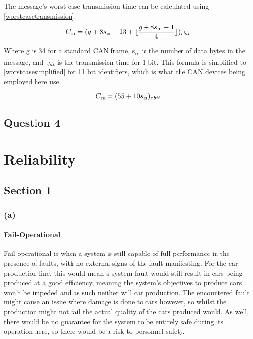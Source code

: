 \documentclass[]{report}
\begin{document}
		The message's worst-case transmission time can be calculated using \ref{worstcasetransmission}.
		\begin{equation}
		\label{worstcasetransmission}
		C\textsubscript{m} = (g + 8s\textsubscript{m} + 13 + \lfloor \frac{g + 8s\textsubscript{m} - 1}{4} \rfloor ) \textsubscript{$\tau bit$}
		\end{equation}
		
		Where g is 34 for a standard CAN frame, s\textsubscript{m} is the number of data bytes in the message, and \textsubscript{$\tau bit$} is the transmission time for 1 bit. This formula is simplified to \ref{worstcasesimplified} for 11 bit identifiers, which is what the CAN devices being employed here use.
		
		\begin{equation}
		\label{worstcasesimplified}
		C\textsubscript{m} = (55 + 10s\textsubscript{m})\textsubscript{$\tau bit$}
		\end{equation}
		
		\section{Question 4}
		
	
	
	\chapter{Reliability}
		\section{Section 1}
			\subsection{(a)}
				\subsubsection{Fail-Operational}
				Fail-operational is when a system is still capable of full performance in the presence of faults, with no external signs of the fault manifesting. For the car production line, this would mean a system fault would still result in cars being produced at a good efficiency, meaning the system's objectives to produce cars won't be impeded and as such neither will car production. The encountered fault might cause an issue where damage is done to cars however, so whilst the production might not fail the actual quality of the cars produced would. As well, there would be no guarantee for the system to be entirely safe during its operation here, so there would be a risk to personnel safety.
				
\end{document}
